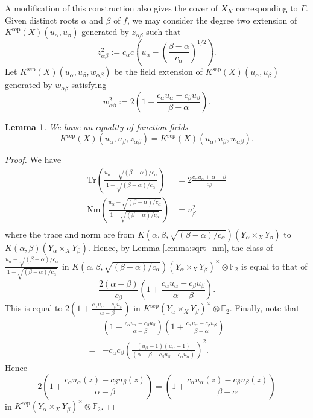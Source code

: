 \documentclass[11pt]{amsart}
\def\F{\mathbb F}
\theoremstyle{plain}
\newtheorem{lemma}{Lemma}
\theoremstyle{definition}
\newcommand{\Tr}{\mathrm{Tr}}
\newcommand{\sep}{\mathrm{sep}}
\newcommand{\Nm}{\mathrm{Nm}}
\begin{document}
A modification of this construction also gives the cover of $X_K$ corresponding to $\Gamma $. Given distinct roots $\alpha $ and $\beta $ of $f$, we may consider the degree two extension of $K^{\sep }(X)(u_{\alpha },u_{\beta })$ generated by $z_{\alpha \beta }$ such that 
\[
z_{\alpha \beta }^2 :=c_{\alpha }c(u_{\alpha }-(\frac{\beta -\alpha }{c_{\alpha }})^{1/2}).
\]
Let $K^{\sep }(X)(u_{\alpha },u_{\beta },w_{\alpha \beta })$ be the field extension of $K^{\sep }(X)(u_{\alpha },u_{\beta })$ generated by $w_{\alpha \beta }$ satisfying 
\begin{equation}\label{eqn:vab}
w_{\alpha \beta }^2 :=2\left(1+ \frac{c_{\alpha }u_{\alpha }-c_{\beta }u_{\beta }}{\beta -\alpha}\right) .
\end{equation}
\begin{lemma}
We have an equality of function fields
\[
K^{\sep }(X)(u_{\alpha },u_{\beta },z_{\alpha \beta })=K^{\sep }(X)(u_{\alpha },u_{\beta },w_{\alpha \beta }).
\]
\end{lemma}
\begin{proof}
We have \begin{align*}
\Tr \left(\frac{u_{\alpha }-\sqrt{(\beta -\alpha )/c_{\alpha }}}{1-\sqrt{(\beta -\alpha )/c_{\alpha }}} \right) & =2\frac{c_{\alpha }u_{\alpha }+\alpha -\beta }{c_{\beta }} \\
\Nm \left(\frac{u_{\alpha }-\sqrt{(\beta -\alpha )/c_{\alpha }}}{1-\sqrt{(\beta -\alpha )/c_{\alpha }}} \right) & =u_\beta ^2 \\
\end{align*}
where the trace and norm are from $K(\alpha ,\beta ,\sqrt{(\beta -\alpha )/c_{\alpha }})(Y_{\alpha }\times _X Y_{\beta })$ to $K(\alpha ,\beta )(Y_{\alpha }\times _X Y_{\beta })$. 
Hence, by Lemma \ref{lemma:sqrt_nm}, the class of $\frac{u_{\alpha }-\sqrt{(\beta -\alpha )/c_{\alpha }}}{1-\sqrt{(\beta -\alpha )/c_{\alpha }}}$ in $K(\alpha ,\beta ,\sqrt{(\beta -\alpha )/c_{\alpha }})(Y_{\alpha }\times _X Y_{\beta })^\times \otimes \F_2$ is equal to that of 
\[
\frac{2(\alpha -\beta )}{c_{\beta }}\left(1+ \frac{c_{\alpha }u_{\alpha }-c_{\beta }u_{\beta }}{\alpha -\beta }\right).
\]
This is equal to $2\left(1+ \frac{c_{\alpha }u_{\alpha }-c_{\beta }u_{\beta }}{\alpha -\beta }\right)$ in $K^{\sep}(Y_{\alpha }\times _X Y_{\beta })^\times \otimes \F _2$. Finally, note that
\begin{align*}
& \left(1+ \frac{c_{\alpha }u_{\alpha }-c_{\beta }u_{\beta }}{\alpha -\beta }\right)\left(1+ \frac{c_{\alpha }u_{\alpha }-c_{\beta }u_{\beta }}{\beta -\alpha }\right) \\
= & -c_{\alpha }c_{\beta }\left( \frac{(u_{\beta }-1)(u_{\alpha }+1)}{(\alpha -\beta -c_{\beta} u_{\beta} -c_{\alpha }u_{\alpha })} \right) ^2 . 
\end{align*}
Hence 
\[
2\left(1+ \frac{c_{\alpha }u_{\alpha }(z)-c_{\beta }u_{\beta }(z)}{\alpha -\beta }\right) =\left(1+ \frac{c_{\alpha }u_{\alpha }(z)-c_{\beta }u_{\beta }(z)}{\beta -\alpha }\right)
\] in $K^{\sep}(Y_{\alpha }\times _X Y_{\beta })^\times \otimes \F _2$.
\end{proof}
\end{document}
